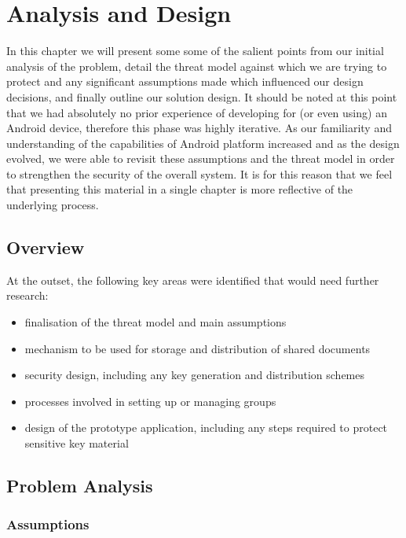 
\chapter{Analysis and Design}
\label{cha:analysis}

In this chapter we will present some some of the salient points from our initial analysis of the problem, detail the threat model against which we are trying to protect and any significant assumptions made which influenced our design decisions, and finally outline our solution design.  It should be noted at this point that we had absolutely no prior experience of developing for (or even using) an Android device, therefore this phase was highly iterative.  As our familiarity and understanding of the capabilities of Android platform increased and as the design evolved, we were able to revisit these assumptions and the threat model in order to strengthen the security of the overall system. It is for this reason that we feel that presenting this material in a single chapter is more reflective of the underlying process.
\section{Overview}
At the outset, the following key areas were identified that would need further research:
\begin{itemize}
\item finalisation of the threat model and main assumptions
\item mechanism to be used for storage and distribution of shared documents
\item security design, including any key generation and distribution schemes
\item processes involved in setting up or managing groups
\item design of the prototype application, including any steps required to protect sensitive key material
\end{itemize}


\section{Problem Analysis}
\label{sec:prob}
\subsection*{Assumptions}

